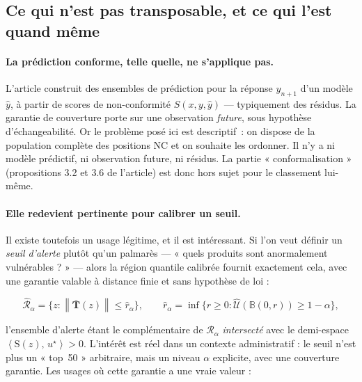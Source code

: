 \documentclass[11pt,a4paper]{article}
\theoremstyle{definition}
\theoremstyle{remark}
\newcommand{\Unif}{\mathcal{U}}
\newcommand{\Bball}{\mathbb{B}}
\newcommand{\norm}[1]{\left\lVert #1 \right\rVert}
\newcommand{\scal}[2]{\left\langle #1 ,\, #2 \right\rangle}
\newcommand{\Tmap}{\mathbf{T}}
\begin{document}
\bigskip

\subsection{Ce qui n'est pas transposable, et ce qui l'est quand même}

\medskip

\paragraph{La prédiction conforme, telle quelle, ne s'applique pas.} L'article construit des
ensembles de prédiction pour la réponse $y_{n+1}$ d'un modèle $\hat y$, à partir de scores de
non-conformité $S(x,y,\hat y)$ --- typiquement des résidus. La garantie de couverture porte sur
une observation \emph{future}, sous hypothèse d'échangeabilité. Or le problème posé ici est
descriptif~: on dispose de la population complète des positions NC et on souhaite les ordonner.
Il n'y a ni modèle prédictif, ni observation future, ni résidus. La partie « conformalisation »
(propositions 3.2 et 3.6 de l'article) est donc hors sujet pour le classement lui-même.

\paragraph{Elle redevient pertinente pour calibrer un seuil.} Il existe toutefois un usage
légitime, et il est intéressant. Si l'on veut définir un \emph{seuil d'alerte} plutôt qu'un
palmarès --- « quels produits sont anormalement vulnérables ? » --- alors la région quantile
calibrée fournit exactement cela, avec une garantie valable à distance finie et sans hypothèse de
loi :

\medskip

\[
\widehat{\mathcal{R}}_\alpha = \big\{z : \norm{\bar{\Tmap}(z)} \le \hat r_\alpha \big\},
\qquad
\hat r_\alpha = \inf\big\{ r \ge 0 : \widehat{\Unif}(\Bball(0,r)) \ge 1 - \alpha \big\},
\]

\bigskip

l'ensemble d'alerte étant le complémentaire de $\widehat{\mathcal{R}}_\alpha$ \emph{intersecté}
avec le demi-espace $\scal{\mathrm{S}(z)}{u^\star} > 0$. L'intérêt est réel dans un contexte
administratif : le seuil n'est plus un « top~50 » arbitraire, mais un niveau $\alpha$ explicite,
avec une couverture garantie. Les usages où cette garantie a une vraie valeur :
\end{document}
